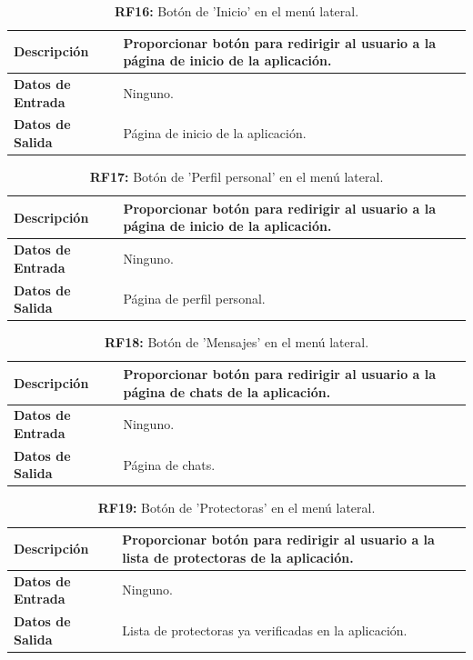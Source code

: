 \documentclass[a4paper, 12pt]{article}
\begin{document}
\begin{table}[H]
\captionsetup{justification=raggedright,singlelinecheck=false}
\caption{\textbf{RF16:} Botón de 'Inicio' en el menú lateral.}
\label{tab:RF16}
	\begin{tabular}{|m{5cm}|m{10cm}|}
	\hline
	\textbf{Descripción} & Proporcionar botón para redirigir al usuario a la página de inicio de la aplicación. \\ 
	\hline
	\textbf{Datos de Entrada} &  Ninguno. \\ 
	\hline
	\textbf{Datos de Salida} &  Página de inicio de la aplicación. \\ 
	\hline
\end{tabular}
\end{table}

\begin{table}[H]
\captionsetup{justification=raggedright,singlelinecheck=false}
\caption{\textbf{RF17:} Botón de 'Perfil personal' en el menú lateral.}
\label{tab:RF17}
	\begin{tabular}{|m{5cm}|m{10cm}|}
	\hline
	\textbf{Descripción} & Proporcionar botón para redirigir al usuario a la página de inicio de la aplicación. \\ 
	\hline
	\textbf{Datos de Entrada} &  Ninguno. \\ 
	\hline
	\textbf{Datos de Salida} &  Página de perfil personal. \\ 
	\hline
\end{tabular}
\end{table}

\begin{table}[H]
\captionsetup{justification=raggedright,singlelinecheck=false}
\caption{\textbf{RF18:} Botón de 'Mensajes' en el menú lateral.}
\label{tab:RF18}
	\begin{tabular}{|m{5cm}|m{10cm}|}
	\hline
	\textbf{Descripción} & Proporcionar botón para redirigir al usuario a la página de chats de la aplicación. \\ 
	\hline
	\textbf{Datos de Entrada} &  Ninguno. \\ 
	\hline
	\textbf{Datos de Salida} &  Página de chats. \\ 
	\hline
\end{tabular}
\end{table}

\begin{table}[H]
\captionsetup{justification=raggedright,singlelinecheck=false}
\caption{\textbf{RF19:} Botón de 'Protectoras' en el menú lateral.}
\label{tab:RF19}
	\begin{tabular}{|m{5cm}|m{10cm}|}
	\hline
	\textbf{Descripción} & Proporcionar botón para redirigir al usuario a la lista de protectoras de la aplicación. \\ 
	\hline
	\textbf{Datos de Entrada} &  Ninguno. \\ 
	\hline
	\textbf{Datos de Salida} &  Lista de protectoras ya verificadas en la aplicación. \\ 
	\hline
\end{tabular}
\end{table}
\end{document}
